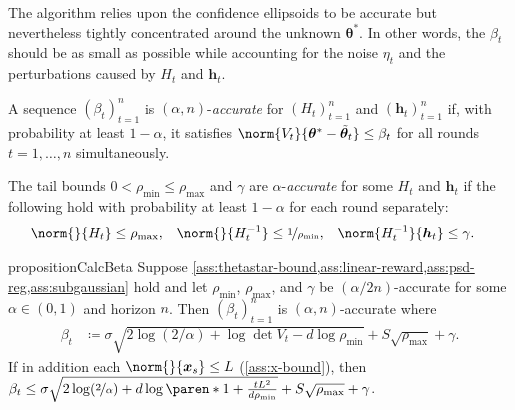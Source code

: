 \documentclass{article}
\renewcommand{\vec}[1]{\bm{#1}}
\newcommand{\defeq}{\coloneq}
\newcommand{\inv}[1]{#1^{-1}}
\renewcommand{\det}{\operatorname{det}}
\DeclarePairedDelimiter{\paren}()
\begin{document}
The algorithm relies upon the confidence ellipsoids to be accurate but
nevertheless tightly concentrated around the unknown $\vec\theta^*$.
In other words, the $\beta_t$ should be as small as possible while
accounting for the noise $\eta_t$ and the perturbations caused by
$H_t$ and $\vec h_t$.

\begin{definition}\label{def:accurate-beta}
  A sequence $(\beta_t)_{t=1}^n$ is $(\alpha, n)$-\emph{accurate} for
  $(H_t)_{t=1}^n$ and $(\vec h_t)_{t=1}^n$ if, with probability at
  least $1-\alpha$, it satisfies
  $\norm{V_t}{\vec\theta^* - \tilde{\vec\theta}_t} \le \beta_t$
  for all rounds $t=1,\dotsc,n$ simultaneously.
\end{definition}

\begin{definition}\label{def:accurate-params}
  The tail bounds $0 < \rho_{\min} \le \rho_{\max}$ and $\gamma$ are
  $\alpha$-\emph{accurate} for some $H_t$ and $\vec h_t$ if the
  following hold with probability at least $1-\alpha$ for each round
  separately:
  \begin{align*}
    \norm{}{H_t} &\le \rho_{\max},
    &\norm{}{\inv{H_t}} &\le \nicefrac{1}{\rho_{\min}},
    &\norm{\inv{H_t}}{\vec h_t} &\le \gamma.
  \end{align*}
\end{definition}

\begin{restatable}{proposition}{CalcBeta}%
  \label{prop:calc-beta}
  Suppose
  \cref{ass:thetastar-bound,ass:linear-reward,ass:psd-reg,ass:subgaussian}
  hold and let $\rho_{\min}$, $\rho_{\max}$, and $\gamma$ be
  $(\alpha/2n)$-accurate for some $\alpha\in(0,1)$ and horizon $n$.
  Then $(\beta_t)_{t=1}^n$ is $(\alpha,n)$-accurate where
  \begin{align*}
    \beta_t &\defeq \sigma\sqrt{2\log(2/\alpha) + \log\det V_t - d\log\rho_{\min}}
             + S\sqrt{\rho_{\max}} + \gamma.
             \end{align*}
    {If in addition each $\norm{}{\vec x_s} \le L$
    (\cref{ass:x-bound}), then}
    $\beta_t \le \sigma\sqrt{2\log(\nicefrac{2}{\alpha}) + d\log\paren*{1 + \frac{tL^2}{d\rho_{\min}}}}
             + S\sqrt{\rho_{\max}} + \gamma$.
\end{restatable}
\vspace{-5pt}
\end{document}
